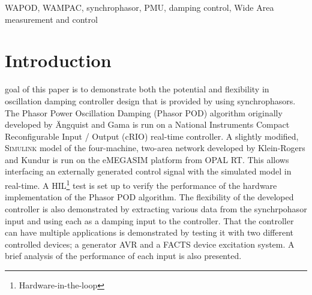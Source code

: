 \documentclass[journal]{IEEEtran}
\begin{document}
\begin{IEEEkeywords}
WAPOD, WAMPAC, synchrophasor, PMU, damping control, Wide Area measurement and control
\end{IEEEkeywords}






%
\IEEEpeerreviewmaketitle



\section{Introduction}
% 
% 
% 
% 
 goal of this paper is to demonstrate both the potential and flexibility in oscillation damping controller design that is provided by using synchrophasors. The Phasor Power Oscillation Damping (Phasor POD) algorithm originally developed by \"{A}ngquist and Gama\cite{PhasorPOD} is run on a National Instruments Compact Reconfigurable Input / Output (cRIO) real-time controller. A slightly modified, \textsc{Simulink} model of the four-machine, two-area network developed by Klein-Rogers and Kundur \cite{KundurTwoArea} is run on the eMEGASIM \cite{eMEGASIM} platform from OPAL RT. This allows interfacing an externally generated control signal with the simulated model in real-time. A HIL\footnote{Hardware-in-the-loop} test is set up to verify the performance of the hardware implementation of the Phasor POD algorithm. The flexibility of the developed controller is also demonstrated by extracting various data from the synchrpohasor input and using each as a damping input to the controller. That the controller can have multiple applications is demonstrated by testing it with two different controlled devices; a generator AVR and a FACTS device excitation system. A brief analysis of the performance of each input is also presented.\\
\end{document}
